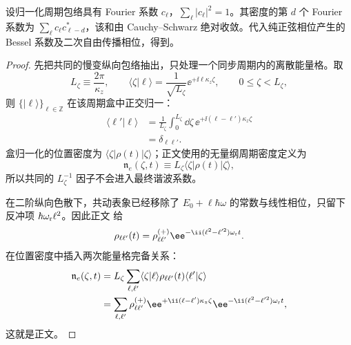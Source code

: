 \begin{proposition}
设归一化周期包络具有 Fourier 系数 $c_\ell$，$\sum_\ell|c_\ell|^2=1$。其密度的第 $d$ 个 Fourier 系数为 $\sum_\ell c_\ell c_{\ell-d}^*$，该和由 Cauchy--Schwarz 绝对收敛。代入纯正弦相位产生的 Bessel 系数及二次自由传播相位，得到。
\end{proposition}
\begin{proof}
先把共同的慢变纵向包络抽出，只处理一个同步周期内的离散能量格。取
\[
L_\zeta\equiv\frac{2\pi}{\kappa_z},
\qquad
\langle\zeta|\ell\rangle
=\frac{1}{\sqrt{L_\zeta}}
\ee^{+\ii\ell\kappa_z\zeta},
\qquad 0\le\zeta<L_\zeta,
\]
则 $\{|\ell\rangle\}_{\ell\in\mathbb Z}$ 在该周期盒中正交归一：
\begin{align*}
\langle\ell'|\ell\rangle
&=\frac1{L_\zeta}
\int_0^{L_\zeta}\dd\zeta\,
\ee^{+\ii(\ell-\ell')\kappa_z\zeta}\\
&=\delta_{\ell\ell'}.
\end{align*}
盒归一化的位置密度为
$\langle\zeta|\rho(t)|\zeta\rangle$；正文使用的无量纲周期密度定义为
\[
\mathfrak n_e(\zeta,t)
\equiv L_\zeta\langle\zeta|\rho(t)|\zeta\rangle,
\]
所以共同的 $L_\zeta^{-1}$ 因子不会进入最终谐波系数。

在二阶纵向色散下，共动表象已经移除了 $E_0+\ell\hbar\omega$ 的常数与线性相位，只留下反冲项 $\hbar\omega_{\rm r}\ell^2$。因此正文 给
\[
\rho_{\ell\ell'}(t)
=\rho_{\ell\ell'}^{(+)}
\ee^{-\ii(\ell^2-\ell'^2)\omega_{\rm r}t}.
\]
在位置密度中插入两次能量格完备关系：
\begin{align*}
\mathfrak n_e(\zeta,t)
&=L_\zeta
\sum_{\ell,\ell'}
\langle\zeta|\ell\rangle
\rho_{\ell\ell'}(t)
\langle\ell'|\zeta\rangle\\
&=\sum_{\ell,\ell'}
\rho_{\ell\ell'}^{(+)}
\ee^{+\ii(\ell-\ell')\kappa_z\zeta}
\ee^{-\ii(\ell^2-\ell'^2)\omega_{\rm r}t},
\end{align*}
这就是正文。


\end{proof}
